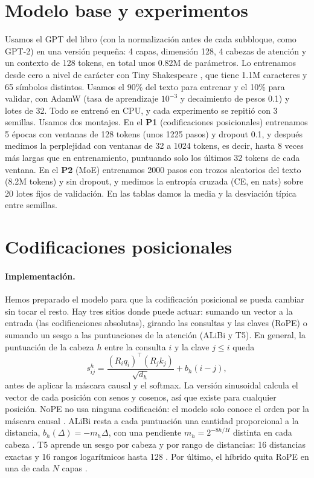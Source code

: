 \documentclass[11pt]{article}
\begin{document}
\section{Modelo base y experimentos}
\label{sec:base}
Usamos el GPT del libro (con la normalización antes de cada subbloque, como GPT-2) en una versión pequeña: 4 capas, dimensión 128, 4 cabezas de atención y un contexto de 128 tokens, en total unos 0.82M de parámetros.
Lo entrenamos desde cero a nivel de carácter con Tiny Shakespeare \citep{karpathy2015charrnn}, que tiene 1.1M caracteres y 65 símbolos distintos.
Usamos el 90\% del texto para entrenar y el 10\% para validar, con AdamW (tasa de aprendizaje $10^{-3}$ y decaimiento de pesos 0.1) y lotes de 32.
Todo se entrenó en CPU, y cada experimento se repitió con 3 semillas.
Usamos dos montajes. En el \textbf{P1} (codificaciones posicionales) entrenamos 5 épocas con ventanas de 128 tokens (unos 1225 pasos) y dropout 0.1, y después medimos la perplejidad con ventanas de 32 a 1024 tokens, es decir, hasta 8 veces más largas que en entrenamiento, puntuando solo los últimos 32 tokens de cada ventana.
En el \textbf{P2} (MoE) entrenamos 2000 pasos con trozos aleatorios del texto (8.2M tokens) y sin dropout, y medimos la entropía cruzada (CE, en nats) sobre 20 lotes fijos de validación.
En las tablas damos la media y la desviación típica entre semillas.

\section{Codificaciones posicionales}
\label{sec:pe}
\paragraph{Implementación.}
Hemos preparado el modelo para que la codificación posicional se pueda cambiar sin tocar el resto.
Hay tres sitios donde puede actuar: sumando un vector a la entrada (las codificaciones absolutas), girando las consultas y las claves (RoPE) o sumando un sesgo a las puntuaciones de la atención (ALiBi y T5).
En general, la puntuación de la cabeza $h$ entre la consulta $i$ y la clave $j\le i$ queda
\begin{equation}
s^h_{ij} = \frac{(R_i q_i)^\top (R_j k_j)}{\sqrt{d_h}} + b_h(i-j),
\end{equation}
antes de aplicar la máscara causal y el softmax.
La versión sinusoidal \citep{vaswani2017attention} calcula el vector de cada posición con senos y cosenos, así que existe para cualquier posición.
NoPE no usa ninguna codificación: el modelo solo conoce el orden por la máscara causal \citep{kazemnejad2023impact}.
ALiBi resta a cada puntuación una cantidad proporcional a la distancia, $b_h(\Delta) = -m_h \Delta$, con una pendiente $m_h = 2^{-8h/H}$ distinta en cada cabeza \citep{press2022alibi}.
T5 aprende un sesgo por cabeza y por rango de distancias: 16 distancias exactas y 16 rangos logarítmicos hasta 128 \citep{raffel2020t5}.
Por último, el híbrido quita RoPE en una de cada $N$ capas \citep{yang2025rope}.
\end{document}
